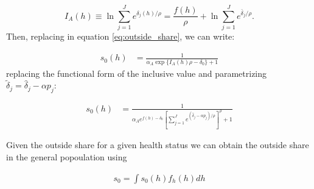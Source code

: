 \documentclass[12pt]{article}
\theoremstyle{plain}
\theoremstyle{plain}
\begin{document}
\[
I_A(h) \equiv \ln \sum_{j=1}^{J} e^{\delta_j(h)/\rho} = \frac{f(h)}{\rho} + \ln \sum_{j=1}^{J} e^{\bar{\delta}_j/\rho}.
\]
Then, replacing in equation \ref{eq:outside_share}, we can write: 


\begin{align}
    s_0(h) %
    &= \frac{1}{\alpha_A\exp\{I_A(h)\rho - \delta_0\} + 1 } 
\end{align}
replacing the functional form of the inclusive value and parametrizing  $\tilde{\delta}_j = \hat{\delta}_j - \alpha p_j$: 

\begin{align}
    s_0(h) %
    &= \frac{1}{\alpha_A e^{f(h) -\delta_0}\left[\sum_{j=1}^{J}e^{(\hat{\delta}_j  - \alpha p_j)/\rho}\right]^\rho + 1 } 
\end{align}


Given the outside share for a given health status we can obtain the outside share in the general popoulation using

\begin{align}
    s_0 = \int s_0(h) f_h(h) dh
\end{align}

 
\end{document}
